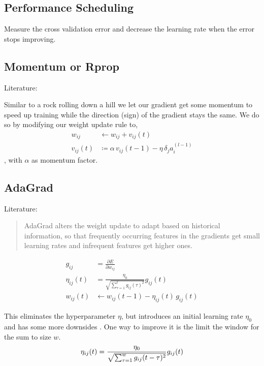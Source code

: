 \subsection{Performance Scheduling}
Measure the cross validation error and decrease the learning rate when the error stops improving.

\subsection{Momentum or Rprop}\label{sec:momentum}
Literature: \cite{Riedmiller1994}

Similar to a rock rolling down a hill we let our gradient get some momentum to speed up training while the direction (sign) of the gradient stays the same. We do so by modifying our weight update rule to,
\begin{align}\label{eq:momentum}
w_{ij} &\leftarrow w_{ij} + v_{ij}(t)\\
v_{ij}(t) &\coloneqq \alpha\, v_{ij}(t-1) - \eta\, \delta_j a_i^{(l-1)}
\end{align}
, with $\alpha$ as momentum factor.


\subsection{AdaGrad}
Literature: \cite{Zeiler2012,Duchi2011,Dyer}

\begin{quote}
AdaGrad alters the weight update to adapt based on historical information, so that frequently occurring features in the gradients get small learning rates and infrequent features get higher ones.
\end{quote}

\begin{align}
g_{ij} &= \frac{\partial E}{\partial w_{ij}}\\
\eta_{ij}(t) &= \frac{\eta_0}{\sqrt{\sum_{\tau=1}^t g_{ij}(\tau)^2}}g_{ij}(t)\\
w_{ij}(t) &\leftarrow w_{ij}(t-1) - \eta_{ij}(t)\,g_{ij}(t)
\end{align}

This eliminates the hyperparameter $\eta$, but introduces an initial learning rate $\eta_0$ and has some more downsides \cite{Zeiler2012}. One way to improve it is the limit the window for the sum to size $w$.
\begin{equation}
\eta_{ij}(t) = \frac{\eta_0}{\sqrt{\sum_{\tau=1}^w g_{ij}(t-\tau)^2}}g_{ij}(t)\\
\end{equation}

